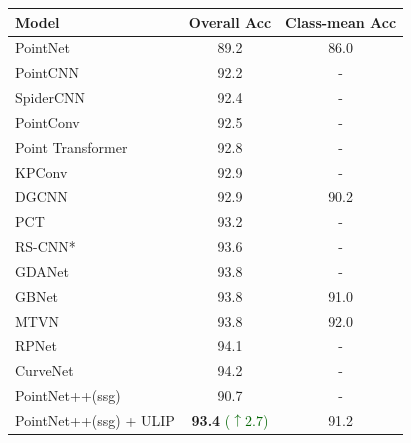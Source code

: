 \documentclass[10pt,twocolumn,letterpaper]{article}
\begin{document}


\begin{table}[htb]
    \small
    \centering
    \begin{tabular}{lcc}
    \toprule
         Model  &  Overall Acc & Class-mean Acc\\
         \midrule
         PointNet \cite{qi2017pointnet}  & 89.2 & 86.0 \\
         PointCNN \cite{li2018pointcnn}  & 92.2 & -\\
         SpiderCNN \cite{xu2018spidercnn} & 92.4 & -\\
         PointConv \cite{wu2019pointconv} & 92.5 & -\\
         Point Transformer \cite{zhao2021point} & 92.8 & -\\
         KPConv \cite{thomas2019kpconv} & 92.9 & -\\
         DGCNN \cite{wang2019dynamic}  & 92.9 & 90.2 \\
         PCT \cite{guo2021pct}  & 93.2 & -\\
         RS-CNN* \cite{liu2019relation}  & 93.6 & -\\
         GDANet \cite{xu2021learning}  & 93.8 & -\\
         GBNet \cite{qiu2021geometric}  & 93.8 & 91.0 \\
         MTVN \cite{hamdi2021mvtn}  & 93.8 & 92.0 \\
         RPNet \cite{ran2021learning} & 94.1 & -\\
         CurveNet \cite{xiang2021walk} & 94.2 &- \\
         \midrule
         PointNet++(ssg) & 90.7 & -\\
         PointNet++(ssg) + ULIP & \textbf{93.4} \textcolor{DarkGreen}{\small ($\uparrow 2.7$)} & 91.2 \\

\end{tabular}
\end{table}
\end{document}
